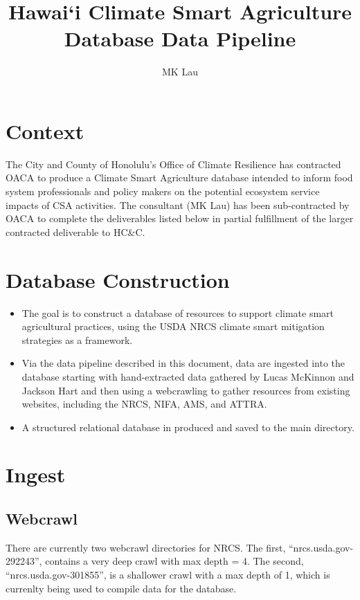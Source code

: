 \documentclass[
]{article}
\title{Hawai`i Climate Smart Agriculture Database Data Pipeline}
\author{MK Lau}
\date{}
\providecommand{\tightlist}{%
  \setlength{\itemsep}{0pt}\setlength{\parskip}{0pt}}
\begin{document}
\maketitle

\section{Context}\label{context}

The City and County of Honolulu's Office of Climate Resilience has
contracted OACA to produce a Climate Smart Agriculture database intended
to inform food system professionals and policy makers on the potential
ecosystem service impacts of CSA activities. The consultant (MK Lau) has
been sub-contracted by OACA to complete the deliverables listed below in
partial fulfillment of the larger contracted deliverable to HC\&C.

\section{Database Construction}\label{database-construction}

\begin{itemize}
\tightlist
\item
  The goal is to construct a database of resources to support climate
  smart agricultural practices, using the USDA NRCS climate smart
  mitigation strategies as a framework.
\item
  Via the data pipeline described in this document, data are ingested
  into the database starting with hand-extracted data gathered by Lucas
  McKinnon and Jackson Hart and then using a webcrawling to gather
  resources from existing websites, including the NRCS, NIFA, AMS, and
  ATTRA.
\item
  A structured relational database in produced and saved to the main
  directory.
\end{itemize}

\section{Ingest}\label{ingest}

\subsection{Webcrawl}\label{webcrawl}

There are currently two webcrawl directories for NRCS. The first,
``nrcs.usda.gov-292243'', contains a very deep crawl with max depth = 4.
The second, ``nrcs.usda.gov-301855'', is a shallower crawl with a max
depth of 1, which is currenlty being used to compile data for the
database.
\end{document}
